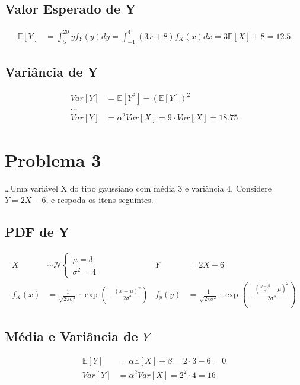 \documentclass{article}
\begin{document}
\subsection{Valor Esperado de Y}
\begin{align*}
    \mathbb{E}[Y] &= \int_{5}^{20} y f_Y(y)dy = \int_{-1}^{4} (3x+8)f_X(x)dx = 3 \mathbb{E}[X] + 8 = 12.5
\end{align*}

\subsection{Variância de Y}
\begin{align*}
    Var[Y] &= \mathbb{E}[Y^2] - (\mathbb{E}[Y])^2 \\
    \ldots\\
    Var[Y] &= \alpha^2 Var[X] = 9 \cdot Var[X] = 18.75
\end{align*}

\section{Problema 3}
\ldots Uma variável X do tipo gaussiano com média 3 e variância 4. Considere $Y = 2X - 6$, e respoda
os itens seguintes.

\subsection{PDF de Y}
\begin{align*}
    X &\sim \mathcal{N}
    \begin{cases}
        \mu = 3\\
        \sigma^2 = 4
    \end{cases}& Y &= 2X - 6 \\
    f_X(x) &= \frac{1}{\sqrt{2\pi\sigma^2}} \cdot \exp{\left(-\frac{(x-\mu)^2}{2\sigma^2}\right)} &
f_y(y) &= \frac{1}{\sqrt{2\pi\sigma^2}} \cdot \exp{\left(-\frac{(\frac{y-\beta}{\alpha}-\mu)^2}{2\sigma^2}\right)}
\end{align*}

\subsection{Média e Variância de $Y$}
\begin{align*}
    \mathbb{E}[Y] &= \alpha \mathbb{E}[X] + \beta = 2\cdot3 - 6 = 0 \\
    Var[Y] &= \alpha^2 Var[X] = 2^2 \cdot 4 = 16
\end{align*}
\end{document}
